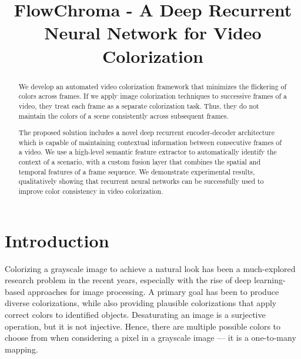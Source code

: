 \documentclass[10pt,twocolumn,letterpaper]{article}
\begin{document}
\title{FlowChroma - A Deep Recurrent Neural Network for Video Colorization}


\maketitle
\ifwacvfinal\thispagestyle{empty}\fi
\begin{abstract}
   We develop an automated video colorization framework that minimizes the flickering of colors across frames. If we apply image colorization techniques to successive frames of a video, they treat each frame as a separate colorization task. Thus, they do not maintain the colors of a scene consistently across subsequent frames.

The proposed solution includes a novel deep recurrent encoder-decoder architecture which is capable of maintaining contextual information between consecutive frames of a video. We use a high-level semantic feature extractor to automatically identify the context of a scenario, with a custom fusion layer that combines the spatial and temporal features of a frame sequence. We demonstrate experimental results, qualitatively showing that recurrent neural networks can be successfully used to improve color consistency in video colorization.
\end{abstract}

\section{Introduction}
Colorizing a grayscale image to achieve a natural look has been a much-explored research problem in the recent years, especially with the rise of deep learning-based approaches for image processing. A primary goal has been to produce diverse colorizations, while also providing plausible colorizations that apply correct colors to identified objects. Desaturating an image is a surjective operation, but it is not injective. Hence, there are multiple possible colors to choose from when considering a pixel in a grayscale image --– it is a one-to-many mapping.
\end{document}
